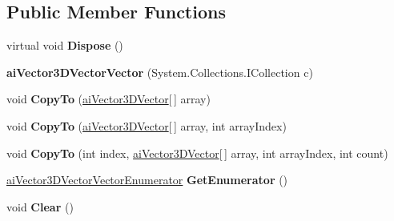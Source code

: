 \subsection*{Public Member Functions}
\begin{DoxyCompactItemize}
\item 
\hypertarget{classai_vector3_d_vector_vector_a161e9d3ec7bd76602503a5df089dafd4}{virtual void {\bfseries Dispose} ()}\label{classai_vector3_d_vector_vector_a161e9d3ec7bd76602503a5df089dafd4}

\item 
\hypertarget{classai_vector3_d_vector_vector_a87c5776b934103bcac23f1b60f723cb4}{{\bfseries ai\+Vector3\+D\+Vector\+Vector} (System.\+Collections.\+I\+Collection c)}\label{classai_vector3_d_vector_vector_a87c5776b934103bcac23f1b60f723cb4}

\item 
\hypertarget{classai_vector3_d_vector_vector_acb9e8e5a109d29c05b24e44b019ec690}{void {\bfseries Copy\+To} (\hyperlink{classai_vector3_d_vector}{ai\+Vector3\+D\+Vector}\mbox{[}$\,$\mbox{]} array)}\label{classai_vector3_d_vector_vector_acb9e8e5a109d29c05b24e44b019ec690}

\item 
\hypertarget{classai_vector3_d_vector_vector_acac59beb485b87783fa8bfd61585b5bc}{void {\bfseries Copy\+To} (\hyperlink{classai_vector3_d_vector}{ai\+Vector3\+D\+Vector}\mbox{[}$\,$\mbox{]} array, int array\+Index)}\label{classai_vector3_d_vector_vector_acac59beb485b87783fa8bfd61585b5bc}

\item 
\hypertarget{classai_vector3_d_vector_vector_a7c3c3e187b2400d00e4467dad3a0ffaf}{void {\bfseries Copy\+To} (int index, \hyperlink{classai_vector3_d_vector}{ai\+Vector3\+D\+Vector}\mbox{[}$\,$\mbox{]} array, int array\+Index, int count)}\label{classai_vector3_d_vector_vector_a7c3c3e187b2400d00e4467dad3a0ffaf}

\item 
\hypertarget{classai_vector3_d_vector_vector_a00edb362812f66feb6538a401bee63e7}{\hyperlink{classai_vector3_d_vector_vector_1_1ai_vector3_d_vector_vector_enumerator}{ai\+Vector3\+D\+Vector\+Vector\+Enumerator} {\bfseries Get\+Enumerator} ()}\label{classai_vector3_d_vector_vector_a00edb362812f66feb6538a401bee63e7}

\item 
\hypertarget{classai_vector3_d_vector_vector_a6ebc12895afb4875a34799516e7fa869}{void {\bfseries Clear} ()}\label{classai_vector3_d_vector_vector_a6ebc12895afb4875a34799516e7fa869}


\end{DoxyCompactItemize}
